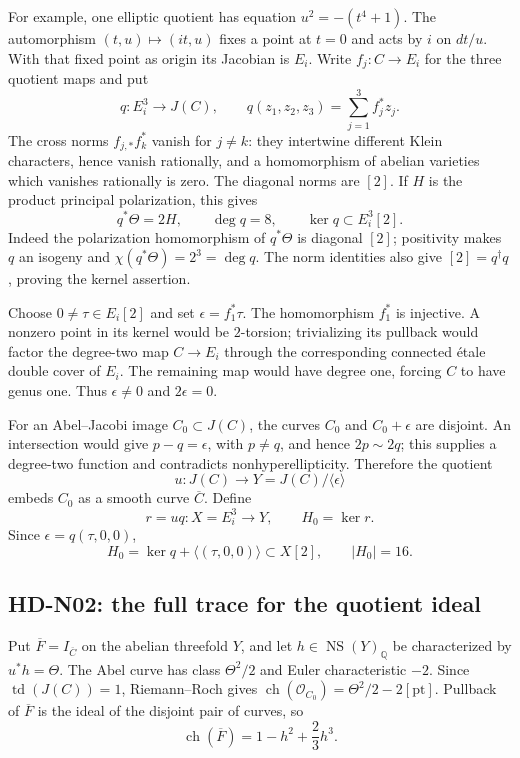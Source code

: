 For example, one elliptic quotient has equation $u^2=-(t^4+1)$.
The automorphism $(t,u)\mapsto(it,u)$ fixes a point at $t=0$ and acts by
$i$ on $dt/u$. With that fixed point as origin its Jacobian is $E_i$.
Write $f_j:C\to E_i$ for the three quotient maps and put
\[
 q:E_i^3\longrightarrow J(C),\qquad
 q(z_1,z_2,z_3)=\sum_{j=1}^3f_j^*z_j.
\]
The cross norms $f_{j,*}f_k^*$ vanish for $j\ne k$: they intertwine
different Klein characters, hence vanish rationally, and a homomorphism
of abelian varieties which vanishes rationally is zero. The diagonal
norms are $[2]$. If $H$ is the product principal polarization, this gives
\begin{equation}\label{hd-n-fermat-isogeny}
 q^*\Theta=2H,\qquad \deg q=8,\qquad \ker q\subset E_i^3[2].
\end{equation}
Indeed the polarization homomorphism of $q^*\Theta$ is diagonal $[2]$;
positivity makes $q$ an isogeny and
$\chi(q^*\Theta)=2^3=\deg q$. The norm identities also give
$[2]=q^\dagger q$, proving the kernel assertion.

Choose $0\ne\tau\in E_i[2]$ and set
$\epsilon=f_1^*\tau$. The homomorphism $f_1^*$ is injective. A nonzero
point in its kernel would be $2$-torsion; trivializing its pullback would
factor the degree-two map $C\to E_i$ through the corresponding connected
\'etale double cover of $E_i$. The remaining map would have degree one,
forcing $C$ to have genus one. Thus $\epsilon\ne0$ and $2\epsilon=0$.

For an Abel--Jacobi image $C_0\subset J(C)$, the curves $C_0$ and
$C_0+\epsilon$ are disjoint. An intersection would give
$p-q=\epsilon$, with $p\ne q$, and hence $2p\sim2q$; this supplies a
degree-two function and contradicts nonhyperellipticity. Therefore the
quotient
\[
 u:J(C)\longrightarrow Y=J(C)/\langle\epsilon\rangle
\]
embeds $C_0$ as a smooth curve $\overline C$. Define
\[
 r=uq:X=E_i^3\longrightarrow Y,\qquad H_0=\ker r.
\]
Since $\epsilon=q(\tau,0,0)$,
\begin{equation}\label{hd-n-H0}
 H_0=\ker q+\langle(\tau,0,0)\rangle\subset X[2],
 \qquad |H_0|=16.
\end{equation}

\subsection{HD-N02: the full trace for the quotient ideal}
\label{hd-n02}

Put $\overline F=I_{\overline C}$ on the abelian threefold $Y$, and let
$h\in\operatorname{NS}(Y)_\mathbb Q$ be characterized by $u^*h=\Theta$.
The Abel curve has class $\Theta^2/2$ and Euler characteristic $-2$.
Since $\operatorname{td}(J(C))=1$, Riemann--Roch gives
$\operatorname{ch}(\mathcal O_{C_0})=\Theta^2/2-2[\mathrm{pt}]$.
Pullback of $\overline F$ is the ideal of the disjoint pair of curves, so
\begin{equation}\label{hd-n-ideal-character}
 \operatorname{ch}(\overline F)=1-h^2+\frac23h^3.
\end{equation}

